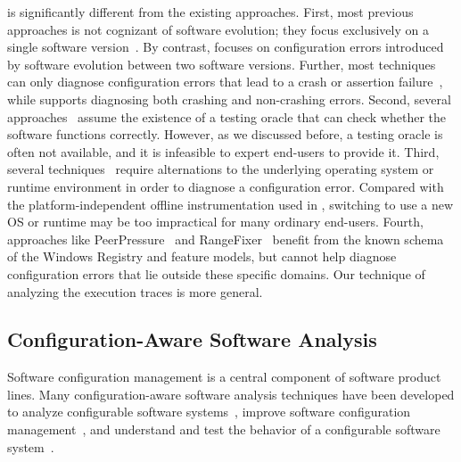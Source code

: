 \ourtool is significantly different from the existing approaches.
First, most previous approaches is not cognizant of software evolution;
they focus exclusively on a single software
version~\cite{Attariyan:2008:UCD, Whitaker:2004:CDS, 
Attariyan:2010:ACT, Rabkin:2011:PPC}. By contrast, \ourtool focuses
on configuration errors introduced by software evolution between
two software versions. Further, most techniques
can only diagnose configuration errors that lead to a crash or
assertion failure~\cite{Attariyan:2008:UCD, Whitaker:2004:CDS, 
Attariyan:2010:ACT, Rabkin:2011:PPC}, while \ourtool supports diagnosing both
crashing and non-crashing errors.
Second, several approaches~\cite{Attariyan:2010:ACT, Whitaker:2004:CDS}
assume the existence of a testing oracle that can 
check whether the software functions correctly. However, as we discussed
before, a testing oracle is often not available, and it
is infeasible to expert end-users to provide it.
Third, several techniques~\cite{Whitaker:2004:CDS, Su:2007:AIC} require alternations
to the underlying operating system or runtime environment
in order to diagnose a configuration error. Compared with
the platform-independent offline instrumentation used
in \ourtool, switching to use a new OS or runtime may be
too impractical for many ordinary end-users.
Fourth, approaches like
PeerPressure~\cite{Wang:2004:AMT} and RangeFixer~\cite{rangefix}
benefit from the known schema of the Windows Registry and
feature models, but cannot help diagnose configuration errors
that lie outside these specific domains. Our technique
of analyzing the execution traces is more general.


\subsection{Configuration-Aware Software Analysis}

Software configuration management is a central component
of software product lines.
Many configuration-aware software analysis techniques
have been developed to analyze configurable software
systems~\cite{Bodden:2013:SLS, Kang:2005:FRL, Mende:2008:SGM,
Kruger:2005:SAE}, improve software configuration
management~\cite{Garvin:2011, Rabiser:2012:QSU, Cooray:2010:RRD,
Barreiros:2009:MRC, TerBeek:2011:GCE}, and understand and test
the behavior of a configurable software
system~\cite{Qu:2008:CRT, SPLAT, Apel:2009:FLA, Shang:2013:ADB,
Staats:2011:PTO}.


